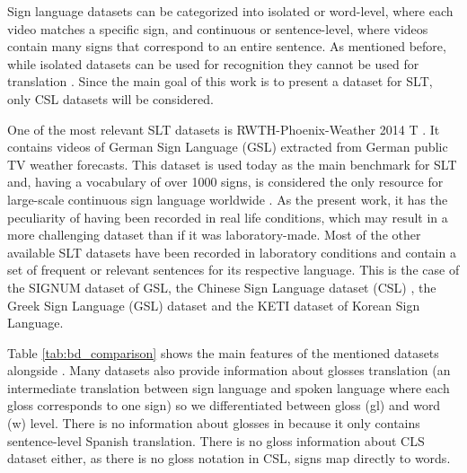 Sign language datasets can be categorized into isolated or word-level, where each video matches a specific sign, and continuous or sentence-level, where videos contain many signs that correspond to an entire sentence. As mentioned before, while isolated datasets can be used for recognition they cannot be used for translation \cite{bragg2019sign}. Since the main goal of this work is to present a dataset for SLT, only CSL datasets will be considered.

One of the most relevant SLT datasets is RWTH-Phoenix-Weather 2014 T \cite{camgoz2018neural}. It contains videos of German Sign Language (GSL) extracted from German public TV weather forecasts. This dataset is used today as the main benchmark for SLT and, having a vocabulary of over 1000 signs, is considered the only resource for large-scale continuous sign language worldwide \cite{koller2020quantitative}. As the present work, it has the peculiarity of having been recorded in real life conditions, which may result in a more challenging dataset than if it was laboratory-made. Most of the other available SLT datasets have been recorded in laboratory conditions and contain a set of frequent or relevant sentences for its respective language. This is the case of the SIGNUM dataset \cite{von2008significance} of GSL, the Chinese Sign Language dataset (CSL) \cite{huang2018video}, the Greek Sign Language (GSL) dataset \cite{adaloglou2020comprehensive} and the KETI dataset \cite{ko2019neural} of Korean Sign Language.

Table \ref{tab:bd_comparison}  shows the main features of the mentioned datasets alongside \dbname. Many datasets also provide information about glosses translation (an intermediate translation between sign language and spoken language where each gloss corresponds to one sign) so we differentiated between gloss (gl) and word (w) level. There is no information about glosses in \dbname because it only contains sentence-level Spanish translation. There is no gloss information about CLS dataset either, as there is no gloss notation in CSL, signs map directly to words.



